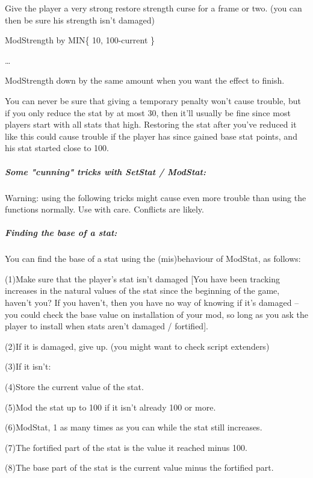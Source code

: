 \documentclass[
]{article}
\begin{document}
Give the player a very strong restore strength curse for a frame or two.
(you can then be sure his strength isn't damaged)

ModStrength by MIN\{ 10, 100-current \}

\ldots{}

ModStrength down by the same amount when you want the effect to finish.

You can never be sure that giving a temporary penalty won't cause
trouble, but if you only reduce the stat by at most 30, then it'll
usually be fine since most players start with all stats that high.
Restoring the stat after you've reduced it like this could cause trouble
if the player has since gained base stat points, and his stat started
close to 100.

\hypertarget{some-cunning-tricks-with-setstat-modstat}{%
\subparagraph{\texorpdfstring{\hfill\break
Some "cunning" tricks with SetStat /
ModStat:}{ Some "cunning" tricks with SetStat / ModStat:}}\label{some-cunning-tricks-with-setstat-modstat}}

Warning: using the following tricks might cause even more trouble than
using the functions normally. Use with care. Conflicts are likely.

\hypertarget{finding-the-base-of-a-stat}{%
\subparagraph{Finding the base of a
stat:}\label{finding-the-base-of-a-stat}}

You can find the base of a stat using the (mis)behaviour of ModStat, as
follows:

(1)Make sure that the player's stat isn't damaged {[}You have been
tracking increases in the natural values of the stat since the beginning
of the game, haven't you? If you haven't, then you have no way of
knowing if it's damaged -- you could check the base value on
installation of your mod, so long as you ask the player to install when
stats aren't damaged / fortified{]}.

(2)If it is damaged, give up. (you might want to check script extenders)

(3)If it isn't:

(4)Store the current value of the stat.

(5)Mod the stat up to 100 if it isn't already 100 or more.

(6)ModStat, 1 as many times as you can while the stat still increases.

(7)The fortified part of the stat is the value it reached minus 100.

(8)The base part of the stat is the current value minus the fortified
part.
\end{document}
